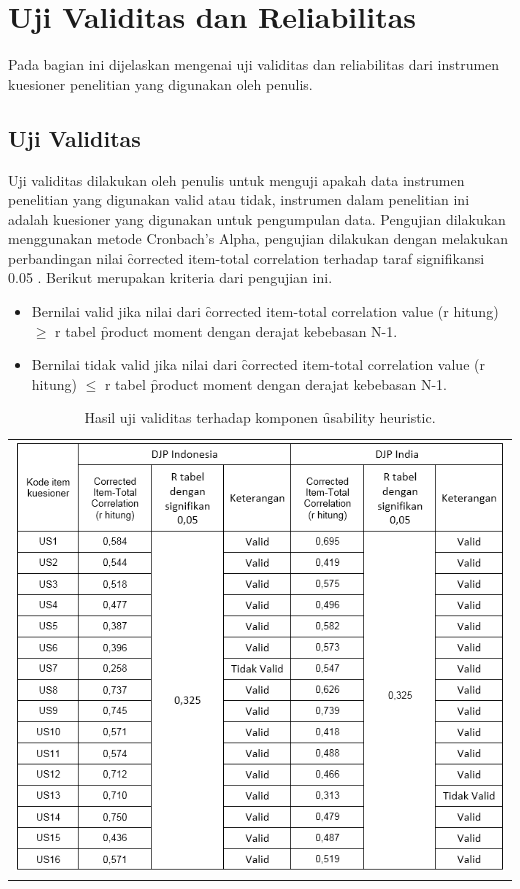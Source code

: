 \section{Uji Validitas dan Reliabilitas}
Pada bagian ini dijelaskan mengenai uji validitas dan reliabilitas dari instrumen kuesioner penelitian yang digunakan oleh penulis.
\subsection{Uji Validitas}
Uji validitas dilakukan oleh penulis untuk menguji apakah data instrumen penelitian yang digunakan valid atau tidak, instrumen dalam penelitian ini adalah kuesioner yang digunakan untuk pengumpulan data. Pengujian dilakukan menggunakan metode Cronbach's Alpha, pengujian dilakukan dengan melakukan perbandingan nilai \f{corrected item-total correlation} terhadap taraf signifikansi 0.05 \citep{buku.riduwan}. Berikut merupakan kriteria dari pengujian ini.
\begin{itemize}
	\item Bernilai valid jika nilai dari \f{corrected item-total correlation value} (r hitung)  $\geq$ r tabel \f{product moment} dengan derajat kebebasan N-1.
	\item Bernilai tidak valid jika nilai dari \f{corrected item-total correlation value} (r hitung)  $\leq$ r tabel \f{product moment} dengan derajat kebebasan N-1.
\end{itemize}
\begin{table}
	\centering
	\caption{Hasil uji validitas terhadap komponen \f{usability heuristic}.}
	\label{tab:ujivaliditasuh}
	\begin{tabular}{c}
		\includegraphics[width=\textwidth]
		{pics/validitasUsabilityHeuristic.PNG}
\end{tabular}
\end{table}
